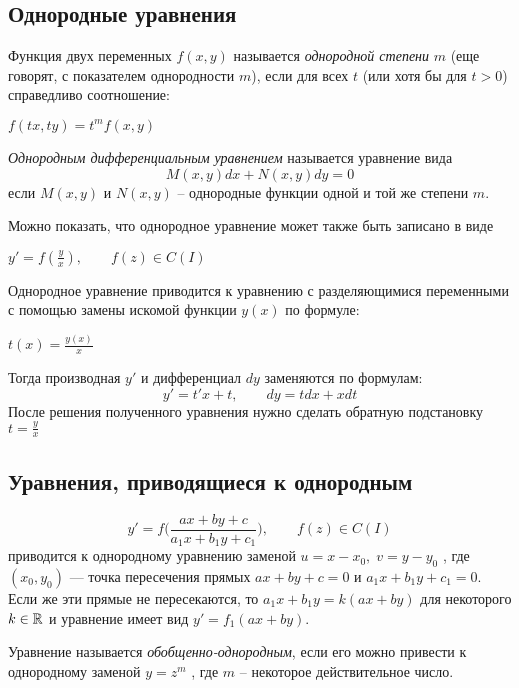 \subsection*{Однородные уравнения}
\Def Функция двух переменных $f(x, y)$ называется \textit{однородной степени} $m$ (еще
говорят, с показателем однородности $m$), если для всех $t$ (или хотя бы для
$t > 0$) справедливо соотношение: 
\begin{center}
    $f(tx, ty) = t^m f(x, y)$
\end{center} 

\textit{Однородным дифференциальным уравнением} называется уравнение вида 
\begin{equation}
    M(x, y) dx + N(x, y) dy = 0
\end{equation}
если $M(x, y)$ и $N(x, y)$ -- однородные функции одной и той же степени $m$. 

Можно показать, что однородное уравнение может
также быть записано в виде 
\begin{center}
    $y' = f(\frac{y}{x}), \qquad f(z)\in C(I)$
\end{center}

Однородное уравнение приводится к уравнению с разделяющимися переменными с помощью замены искомой функции $y(x)$ по формуле:
\begin{center}
    $t(x) = \frac{y(x)}{x}$
\end{center}

Тогда производная $y'$ и дифференциал $dy$ заменяются по формулам:
\begin{equation*}
    y' = t'x + t, \qquad dy = tdx + xdt
\end{equation*}
После решения полученного уравнения нужно сделать обратную подстановку $t = \frac{y}{x}$


\subsection*{Уравнения, приводящиеся к однородным}
\begin{equation*}
    y' = f\Big(\frac{ax + by + c}{a_1x + b_1y + c_1}\Big), \qquad f(z)\in C(I)
\end{equation*}
приводится к однородному уравнению заменой $u = x - x_0, \; v = y - y_0$ , где $(x_0, y_0)$ — точка пересечения прямых $ax+by+c = 0$ и $a_1x+b_1y+c_1 = 0$. Если
же эти прямые не пересекаются, то $a_1x + b_1y = k(ax + by)$ для некоторого $k \in \mathbb{R}$ и уравнение имеет вид $y' = f_1(ax+by)$.

\Def Уравнение называется \textit{обобщенно-однородным}, если его можно привести к
однородному заменой $y = z^m$ , где $m$ -- некоторое действительное число.

